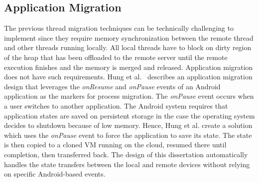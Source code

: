 \subsection{Application Migration}
\label{intro:app_migration}
%
The previous thread migration techniques can be technically challenging
to implement since they require memory synchronization between the
remote thread and other threads running locally.
%
All local threads have to block on dirty region of the heap that has
been offloaded to the remote server until the remote execution finishes
and the memory is merged and released.
%
Application migration does not have such requirements.
%
Hung et al.~\cite{hung} describes an application migration design that
leverages the \textit{onResume} and \textit{onPause} events of an Android
application as the markers for process migration.
%
The \textit{onPause} event occurs when a user switches to another
application.
%
The Android system requires that application states are saved on
persistent storage in the case the operating system decides to shutdown
because of low memory.
%
Hence, Hung et al. create a solution which uses the \textit{onPause}
event to force the application to save its state.
%
The state is then copied to a cloned VM running on the cloud, resumed
there until completion, then transferred back.
%
The design of this dissertation automatically handles the state transfers between
the local and remote devices without relying on specific Android-based
events.
%
